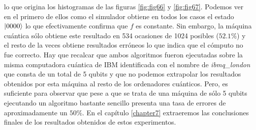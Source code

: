 lo que origina los histogramas de las figuras \ref{fig:fig66} y \ref{fig:fig67}. Podemos ver en el primero de ellos como el simulador obtiene en todos los casos el estado $\left|0000\right\rangle$ lo que efectivamente confirma que $f$ es constante. Sin embargo, la máquina cuántica sólo obtiene este resultado en 534 ocasiones de 1024 posibles ($52.1\%$) y el resto de la veces obtiene resultados erróneos lo que indica que el cómputo no fue correcto. Hay que recalcar que ambos algoritmos fueron ejecutadas sobre la misma computadora cuántica de IBM identificada con el nombre de \textit{ibmq\_london} que consta de un total de 5 qubits y que no podemos extrapolar los resultados obtenidos por esta máquina al resto de los ordenadores cuánticos. Pero, es suficiente para observar que pese a que se trata de una máquina de sólo 5 qubits ejecutando un algoritmo bastante sencillo presenta una tasa de errores de aproximadamente un $50\%$. En el capítulo \ref{chapter7} extraeremos las conclusiones finales de los resultados obtenidos de estos experimentos.
